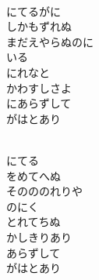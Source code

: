 \documentclass[10pt,b5j]{tarticle} %
\begin{document}
\vspace{1.5em} %
\newcommand{\linespace}{0.5em} %
\newcommand{\blocksize}{0.5\hsize} %
\newcommand{\itemmargin}{6em} %
\begin{enumerate} %
    \setlength{\itemindent}{\itemmargin} %
    \begin{minipage}[c]{\blocksize}
    
        \vspace{\linespace}
        \item~\\
        にてるがに\\
        しかもずれぬ\\
        まだえやらぬのに\\
        いる\\
        にれなと\\
        かわすしさよ\\
        にあらずして\\
        がはとあり
        
        \vspace{\linespace}
        \item~\\
        にてる\\
        をめてへぬ\\
        そのののれりや\\
        のにく\\
        とれてちぬ\\
        かしきりあり\\
        あらずして\\
        がはとあり
        

\end{minipage}
\end{enumerate}
\end{document}
